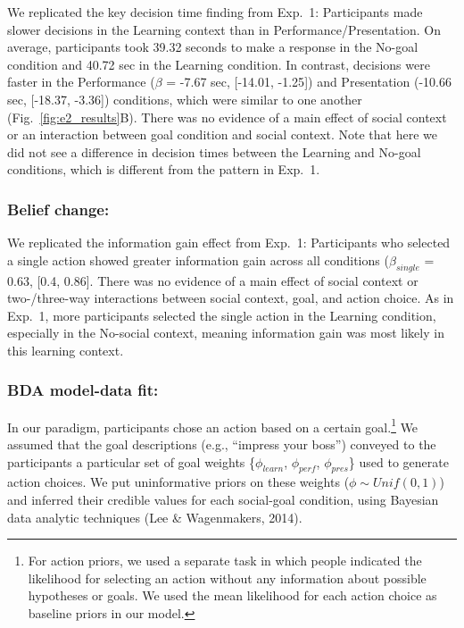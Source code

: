 \documentclass[10pt, letterpaper]{article}
\begin{document}
We replicated the key decision time finding from Exp.~1: Participants
made slower decisions in the Learning context than in
Performance/Presentation. On average, participants took 39.32 seconds to
make a response in the No-goal condition and 40.72 sec in the Learning
condition. In contrast, decisions were faster in the Performance
(\(\beta\) = -7.67 sec, {[}-14.01, -1.25{]}) and Presentation (-10.66
sec, {[}-18.37, -3.36{]}) conditions, which were similar to one another
(Fig.~\ref{fig:e2_results}B). There was no evidence of a main effect of
social context or an interaction between goal condition and social
context. Note that here we did not see a difference in decision times
between the Learning and No-goal conditions, which is different from the
pattern in Exp.~1.

\subsubsection{Belief change:}\label{belief-change-1}

We replicated the information gain effect from Exp.~1: Participants who
selected a single action showed greater information gain across all
conditions (\(\beta_{single}\) = 0.63, {[}0.4, 0.86{]}. There was no
evidence of a main effect of social context or two-/three-way
interactions between social context, goal, and action choice. As in
Exp.~1, more participants selected the single action in the Learning
condition, especially in the No-social context, meaning information gain
was most likely in this learning context.

\subsubsection{BDA model-data fit:}\label{bda-model-data-fit}

In our paradigm, participants chose an action based on a certain
goal.\footnote{For action priors, we used a separate task in which people indicated the likelihood for selecting an action without any information about possible hypotheses or goals. We used the mean likelihood for each action choice as baseline priors in our model.}
We assumed that the goal descriptions (e.g., ``impress your boss'')
conveyed to the participants a particular set of goal weights
\{\(\phi_{learn}\), \(\phi_{perf}\), \(\phi_{pres}\)\} used to generate
action choices. We put uninformative priors on these weights
(\(\phi \sim Unif(0,1)\)) and inferred their credible values for each
social-goal condition, using Bayesian data analytic techniques (Lee \&
Wagenmakers, 2014).
\end{document}
